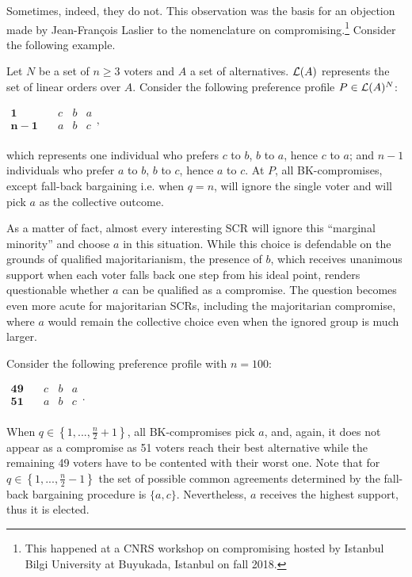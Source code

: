 \documentclass[version=3.21, pagesize, twoside=off, bibliography=totoc, DIV=calc, fontsize=12pt, a4paper]{scrartcl}
\begin{document}
Sometimes, indeed, they do not. This observation was the basis for an objection made by Jean-François Laslier to the nomenclature on compromising.\footnote{This happened at a CNRS workshop on compromising hosted by Istanbul Bilgi University at Buyukada, Istanbul on fall 2018.} Consider the following example.
\begin{example}
	\label{ex:ex1}
	Let $N$ be a set of $n ≥ 3$ voters and $A$ a set of alternatives. $\mathcal{L}(A)$ represents the set of linear orders over $A$. Consider the following preference profile $P\in \mathcal{L}(A)^{N}$:
	\begin{center}
		$
		\begin{array}{cccc}
		\mathbf{1} \quad &c&b&a\\
		\mathbf{n-1} \quad &a&b&c\\
		\end{array},
		$
	\end{center}
	which represents one individual who prefers $c$ to $b$, $b$ to $a$, hence $c$ to $a$; and $n-1$ individuals who prefer $a$ to $b$, $b$ to $c$, hence $a$ to $c$. At $P$, all BK-compromises, except fall-back bargaining i.e. when $q=n$, will ignore the single voter and will pick $a$ as the collective outcome.
\end{example}

As a matter of fact, almost every interesting SCR will ignore this “marginal minority” and choose $a$ in this situation. While this choice is defendable on the grounds of qualified majoritarianism, the presence of $b$, which receives unanimous support when each voter falls back one step from his ideal point, renders questionable whether $a$ can be qualified as a compromise. The question becomes even more acute for majoritarian SCRs, including the majoritarian compromise, where $a$ would
remain the collective choice even when the ignored group is much larger.

\begin{example}
	\label{ex:ex2}
	Consider the following preference profile with $n=100$:
	\begin{center}
		$
		\begin{array}{cccc}
		\mathbf{49} \quad &c&b&a\\
		\mathbf{51} \quad &a&b&c\\
		\end{array}.
		$
	\end{center}
	When $q\in \left\{ 1,..., \frac{n}{2} +1\right\} $, all BK-compromises pick $a$, and, again, it does not appear as a compromise as 51 voters reach their best alternative while the remaining 49 voters have to be contented with their worst one. Note that for $q\in \left\{ 1,..., \frac{n}{2} -1 \right\} $ the set of possible common agreements determined by the fall-back bargaining procedure is $\{a,c\}$. Nevertheless, $a$ receives the highest support, thus it is elected.
\end{example}
\end{document}
